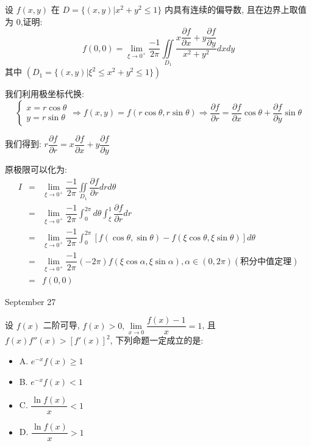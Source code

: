 \begin{example}[][Exam: 35.4.10]
	设 $f(x,y)$ 在 $D=\{(x,y)|x^2+y^2\leq 1\}$ 内具有连续的偏导数, 且在边界上取值为 $0$,证明:  
$$f(0,0)=\lim\limits_{\xi\to 0^{+}}\dfrac{-1}{2\pi}\iint\limits_{D_{1}}\dfrac{x\dfrac{\partial f}{\partial x}+y\dfrac{\partial f}{\partial y}}{x^2+y^2}dxdy$$
其中 $(D_{1}=\{(x,y)|\xi^{2}\leq x^2+y^2\leq 1\})$
\end{example}
\begin{solution}

	我们利用极坐标代换:  
	$$\left\lbrace
	\begin{array}{l}
		x=r\cos\theta\\
		y=r\sin\theta
	\end{array}
	\right. \Rightarrow f(x,y)=f(r\cos\theta,r\sin\theta)\Rightarrow \dfrac{\partial f}{\partial r}=\dfrac{\partial f}{\partial x}\cos\theta+\dfrac{\partial f}{\partial y}\sin\theta$$
	
	我们得到:  $r\dfrac{\partial f}{\partial r}=x\dfrac{\partial f}{\partial x}+y\dfrac{\partial f}{\partial y}$
	
	原极限可以化为:  
	\begin{eqnarray*}
		I&=&\lim\limits_{\xi\to 0^{+}}\dfrac{-1}{2\pi}\iint\limits_{D_{1}}\dfrac{\partial f}{\partial r}drd\theta\\
		&=&\lim\limits_{\xi\to 0^{+}}\dfrac{-1}{2\pi}\int_{0}^{2\pi}d\theta\int_{\xi}^{1}\dfrac{\partial f}{\partial r}dr\\
		&=&\lim\limits_{\xi\to 0^{+}}\dfrac{-1}{2\pi}\int_{0}^{2\pi}[f(\cos\theta,\sin\theta)-f(\xi\cos\theta,\xi\sin\theta)]d\theta\\
		&=&\lim\limits_{\xi\to 0^{+}}\dfrac{-1}{2\pi}(-2\pi)f(\xi\cos\alpha,\xi\sin\alpha),\alpha\in(0,2\pi)(\text{积分中值定理})\\
		&=&f(0,0)
	\end{eqnarray*}
\end{solution}


\textcolor{purplea}{September 27}

\begin{example}[][Exam: 35.4.11]
	设 $f(x)$ 二阶可导, $f(x)>0, \lim\limits_{x\to 0}\dfrac{f(x)-1}{x}=1$, 且 $f(x)f''(x)>[f'(x)]^2$, 下列命题一定成立的是:  
\begin{itemize}
	\item A. $e^{-x}f(x)\geq 1$
	\item B. $e^{-x}f(x)<1$
	\item C. $\dfrac{\ln f(x)}{x}<1$
	\item D. $\dfrac{\ln f(x)}{x}>1$
\end{itemize}
\end{example}

